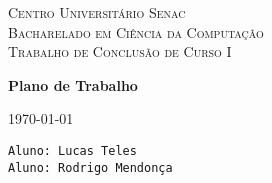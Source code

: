 \documentclass[12pt]{article}
\begin{document}
 
\begin{center}
\textsc{Centro Universitário Senac} \\
\textsc{Bacharelado em Ciência da Computação} \\
\textsc{Trabalho de Conclusão de Curso I} \\
\end{center}

\vspace{.3cm}

\centerline{\textbf{Plano de Trabalho}}

\vspace{.25cm}

\centerline{\today}

\vspace{.25cm}

\noindent
\texttt{Aluno: Lucas Teles} \\
\texttt{Aluno: Rodrigo Mendonça}

\vspace{.25cm}
\end{document}
